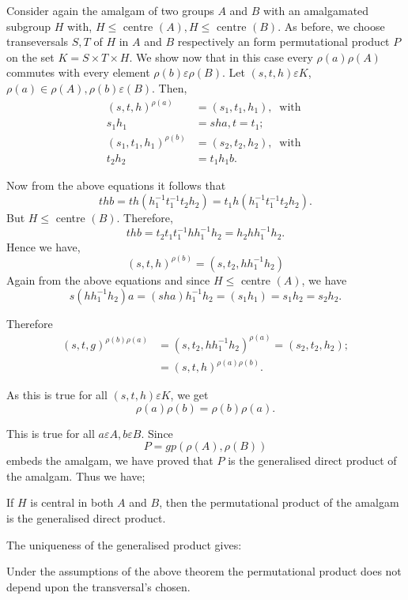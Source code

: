 Consider again the amalgam of two groups $A$ and $B$ with an
amalgamated subgroup $H$ with, $H \leq \text{ centre  }(A),H \leq
\text{ centre }(B)$. As before, we choose transeversals $S, T$ of $H$
in $A$ and $B$ respectively an form permutational product $P$ on the
set $K = S \times T \times H$. We show now that in this case every
$\rho (a) \rho (A)$ commutes with every element $\rho (b) \varepsilon
\rho (B)$. Let $(s, t, h)\varepsilon K$,  $\rho (a) \in \rho (A), \rho
(b) \varepsilon (B)$. Then,  
\begin{align*}
  (s, t, h )^{ \rho (a)} & = (s_1,  t_1, h_1), ~\text{ with }\\
  s_1 h_1 & = sha,  t = t_1 ; \\
  (s_1,  t_1,  h_1)^{ \rho (b)}  & = (s_2, t_2, h_2), ~\text{ with }\\
  t_2 h_2 & = t _1 h_1 b. 
\end{align*}

Now from the above equations it follows that 
$$
thb = th (h_1^{-1} t_1^{ -1}t_2 h_2) = t_1 h (h^{-1}_1 t^{-1}_1 t_2  h_2). 
$$
But $H \leq$ centre $(B)$. Therefore, 
$$
thb = t_2 t_1 t_1 ^{-1} hh_1^{-1} h_2 = h_2 hh^{-1}_1 h_2. 
$$
Hence we have, 
$$
(s, t,  h)^{\rho (b)} = (s,  t_2,  hh_1^{-1} h_2 )
$$
Again from the above equations and since $H \leq $ centre $(A)$, we have 
$$
s (hh^{-1}_1 h_2 ) a = ( sha ) h_1^{-1} h_2 = (s_1 h_1 ) = s_1 h_2 = s_2 h_2. 
$$

Therefore
\begin{align*}
  (s, t, g) ^{\rho (b) \rho (a)} & = (s, t _2,  hh^{-1}_1 h_2)^{\rho
    (a) }= (s_2,  t_2,  h_2) ; \\ 
  &= (s, t, h)^{\rho (a) \rho (b)}. 
\end{align*}

As this is true for all $(s, t, h)\varepsilon K$, we get 
$$
\rho (a) \rho (b) = \rho (b) \rho (a). 
$$

This is true for all $a \varepsilon A, b \varepsilon B$. Since 
$$
P = gp(\rho (A), \rho (B))
$$
embeds the amalgam, we have proved that $P$ is the generalised direct
product of the amalgam. Thus we have;  
\begin{Theorem} %
  If $H$ is central in both $A$ and $B$, then the permutational
  product of the amalgam is the generalised direct product.  
 \end{Theorem}
 
The uniqueness of the generalised product gives:
\begin{corollary}
  Under the assumptions of the above theorem the permutational product
  does not depend upon the transversal's chosen. 
\end{corollary} 
 
